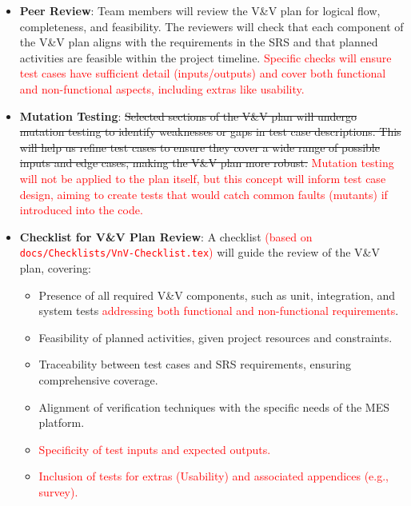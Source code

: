 \documentclass[12pt, titlepage]{article}
\begin{document}
\begin{itemize}
    \item \textbf{Peer Review}: Team members will review the V\&V plan for logical flow, completeness, and feasibility. The reviewers will check that each component of the V\&V plan aligns with the requirements in the SRS and that planned activities are feasible within the project timeline. \textcolor{red}{Specific checks will ensure test cases have sufficient detail (inputs/outputs) and cover both functional and non-functional aspects, including extras like usability.}

    \item \textbf{Mutation Testing}: \sout{Selected sections of the V\&V plan will undergo mutation testing to identify weaknesses or gaps in test case descriptions. This will help us refine test cases to ensure they cover a wide range of possible inputs and edge cases, making the V\&V plan more robust.} \textcolor{red}{Mutation testing will not be applied to the plan itself, but this concept will inform test case design, aiming to create tests that would catch common faults (mutants) if introduced into the code.}

    \item \textbf{Checklist for V\&V Plan Review}: A checklist \textcolor{red}{(based on \texttt{docs/Checklists/VnV-Checklist.tex})} will guide the review of the V\&V plan, covering:
    \begin{itemize}
        \item Presence of all required V\&V components, such as unit, integration, and system tests \textcolor{red}{addressing both functional and non-functional requirements}.
        \item Feasibility of planned activities, given project resources and constraints.
        \item Traceability between test cases and SRS requirements, ensuring comprehensive coverage.
        \item Alignment of verification techniques with the specific needs of the MES platform.
        \item \textcolor{red}{Specificity of test inputs and expected outputs.}
        \item \textcolor{red}{Inclusion of tests for extras (Usability) and associated appendices (e.g., survey).}
    \end{itemize}


\end{itemize}
\end{document}
